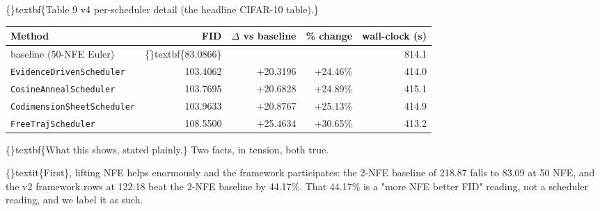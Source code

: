 \documentclass{article}
\begin{document}
\begin{table}[ht]
\centering
\small
{}%
\end{table}

\{\}textbf\{Table 9  v4 per-scheduler detail (the headline CIFAR-10 table).\}

\begin{table}[ht]
\centering
\small
\begin{tabular}{lrrrr}
\hline
\textbf{Method} & \textbf{FID} & \textbf{$\Delta$ vs baseline} & \textbf{\% change} & \textbf{wall-clock (s)} \\
\hline
baseline (50-NFE Euler) & \{\}textbf\{83.0866\} &  &  & 814.1 \\
\texttt{EvidenceDrivenScheduler} & 103.4062 & +20.3196 & +24.46\% & 414.0 \\
\texttt{CosineAnnealScheduler} & 103.7695 & +20.6828 & +24.89\% & 415.1 \\
\texttt{CodimensionSheetScheduler} & 103.9633 & +20.8767 & +25.13\% & 414.9 \\
\texttt{FreeTrajScheduler} & 108.5500 & +25.4634 & +30.65\% & 413.2 \\
\hline
\end{tabular}
\end{table}

\{\}textbf\{What this shows, stated plainly.\} Two facts, in tension, both true.

\{\}textit\{First\}, lifting NFE helps enormously and the framework participates: the 2-NFE baseline of 218.87 falls to 83.09 at 50 NFE, and the v2 framework rows at 122.18 beat the 2-NFE baseline by 44.17\%. That 44.17\% is a "more NFE  better FID" reading, not a scheduler reading, and we label it as such.
\end{document}

